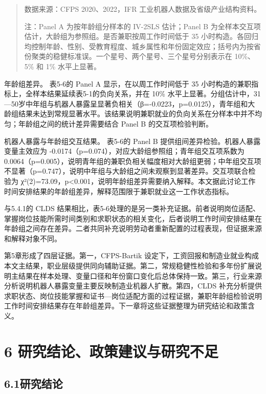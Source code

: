 \begin{quote}
数据来源：CFPS 2020、2022，IFR 工业机器人数据及省级产业结构资料。

注：Panel A 为按年龄组分样本的 IV-2SLS 估计；Panel B 为全样本交互项估计，大龄组为参照组。是否兼职按周工作时间低于 35 小时构造。各回归均控制年龄、性别、受教育程度、城乡属性和年份固定效应；括号内为按省份聚类的稳健标准误。一个星号、两个星号、三个星号分别表示在 10\%、5\% 和 1\% 水平上显著。
\end{quote}

年龄组差异。 表5-6的 Panel A 显示，在以周工作时间低于 35 小时构造的兼职指标上，全样本结果延续表5-1的负向关系，并在 10\% 水平上显著。分组估计中，31---50岁中年组与机器人暴露呈显著负相关（β=-0.0223，p=0.0125），青年组和大龄组结果未达到常规显著水平。该结果说明兼职就业的负向关系在分样本中并不均匀；年龄组之间的统计差异需要结合 Panel B 的交互项检验判断。

机器人暴露与年龄组交互结果。 表5-6的 Panel B 提供组间差异检验。机器人暴露变量主效应为 -0.0174（p=0.074），对应大龄组参照组；青年组交互项系数为 0.0064（p=0.005），说明青年组的兼职负相关幅度相对大龄组更弱；中年组交互项不显著（p=0.747），说明中年组与大龄组之间未观察到显著差异。交互项联合检验为 χ²(2)=73.09，p\textless0.001，说明年龄组差异需要纳入解释。本文据此讨论工作时间安排结果的年龄组差异，解释范围限于兼职就业这一工作状态指标。

与5.4.1的 CLDS 结果相比，表5-6处理的是另一类补充证据。前者说明岗位适配、掌握岗位技能所需时间类别和求职状态的相关变化，后者说明工作时间安排结果在年龄组之间存在差异。二者共同补充说明劳动者重新配置的过程表现，但证据来源和解释对象不同。

第5章形成了四层证据。第一，CFPS-Bartik 设定下，工资回报和制造业就业构成本文主结果，职业层级提供同向辅助证据。第二，常规稳健性检验和多年份扩展说明主结果在样本处理、变量口径和年份窗口变化后总体保持一致。第三，行业来源分析说明机器人暴露变量主要反映制造业机器人扩散。第四，CLDS 补充分析提供求职状态、岗位技能掌握和证书---岗位适配方面的过程证据，兼职年龄组检验说明工作时间安排结果存在年龄组差异。下一章将这些证据整理为研究结论和政策含义。

\section{6 研究结论、政策建议与研究不足}\label{ux7814ux7a76ux7ed3ux8bbaux653fux7b56ux5efaux8baeux4e0eux7814ux7a76ux4e0dux8db3}

\subsection{6.1研究结论}\label{ux7814ux7a76ux7ed3ux8bba}

